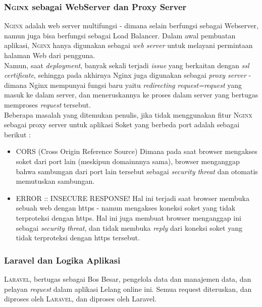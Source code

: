     \subsubsection{\textbf{\textsc{Nginx} sebagai WebServer dan Proxy Server}}
    {\scshape Nginx} adalah web server multifungsi - dimana selain berfungsi sebagai Webserver, namun juga bisa berfungsi sebagai Load Balancer. Dalam awal pembuatan aplikasi, \textsc{Nginx} hanya digunakan sebagai \textit{web server} untuk melayani permintaan halaman Web dari pengguna.
    \\
    Namun, saat \textit{deployment}, banyak sekali terjadi \textit{issue} yang berkaitan dengan \textit{ssl certificate}, sehingga pada akhirnya Nginx juga digunakan sebagai \textit{proxy server} - dimana Nginx mempunyai fungsi baru yaitu \textit{redirecting request=request} yang masuk ke dalam server, dan meneruskannya ke proses dalam server yang bertugas memproses \textit{request} tersebut.
	   \\
    Beberapa masalah yang ditemukan penulis, jika tidak menggunakan fitur \textsc{Nginx} sebagai proxy server untuk aplikasi Soket yang berbeda port adalah sebagai berikut :
	    \begin{itemize}[noitemsep,topsep=0pt]
	    \item CORS (Cross Origin Reference Source)
	    \newline
	    Dimana pada saat browser mengakses soket dari port lain (meskipun domainnnya sama), browser menganggap bahwa sambungan dari port lain tersebut sebagai \textit{security threat} dan otomatis memutuskan sambungan.
	    \item ERROR :: INSECURE RESPONSE!
	    \newline
	    Hal ini terjadi saat browser membuka sebuah web dengan https - namun mengakses koneksi soket yang tidak terproteksi dengan https. Hal ini juga membuat browser menganggap ini sebagai \textit{security threat}, dan tidak membuka \textit{reply} dari koneksi soket yang tidak terproteksi dengan https tersebut.
	    \end{itemize}
    
    \subsubsection {\textbf{Laravel dan Logika Aplikasi}}
    \textsc{Laravel}, bertugas sebagai Bos Besar, pengelola data dan manajemen data, dan pelayan \textit{request} dalam aplikasi Lelang online ini. Semua request diteruskan, dan diproses oleh \textsc{Laravel}, dan diproses oleh Laravel. 	    
    
